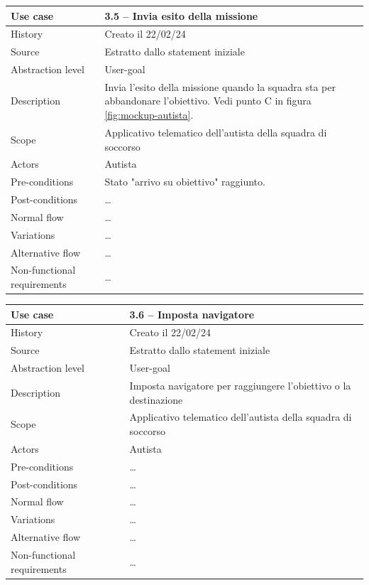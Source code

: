 \documentclass{article}
\begin{document}
    \begin{table}
        \begin{tabularx}{\textwidth}{l|X}
            Use case & \textbf{3.5 – Invia esito della missione}\\
            \hline
            History & Creato il 22/02/24\\
            Source & Estratto dallo statement iniziale\\
            Abstraction level & User-goal\\
            Description & Invia l'esito della missione quando la squadra sta per abbandonare l'obiettivo. Vedi punto C in figura \ref{fig:mockup-autista}.\\
            Scope & Applicativo telematico dell'autista della squadra di soccorso\\
            Actors & Autista\\
            Pre-conditions & Stato "arrivo su obiettivo" raggiunto. \\
            Post-conditions & \dots \\
            Normal flow & \dots\\
            Variations & \dots \\
            Alternative flow & \dots \\
            Non-functional requirements & \dots
        \end{tabularx}
        \label{tab:usecase3.5}
    \end{table}

    \begin{table}
        \begin{tabularx}{\textwidth}{l|X}
            Use case & \textbf{3.6 – Imposta navigatore}\\
            \hline
            History & Creato il 22/02/24\\
            Source & Estratto dallo statement iniziale\\
            Abstraction level & User-goal\\
            Description & Imposta navigatore per raggiungere l'obiettivo o la destinazione\\
            Scope & Applicativo telematico dell'autista della squadra di soccorso\\
            Actors & Autista\\
            Pre-conditions & \dots \\
            Post-conditions & \dots \\
            Normal flow & \dots\\
            Variations & \dots \\
            Alternative flow & \dots \\
            Non-functional requirements & \dots
        \end{tabularx}
        \label{tab:usecase3.6}
    \end{table}
\end{document}

